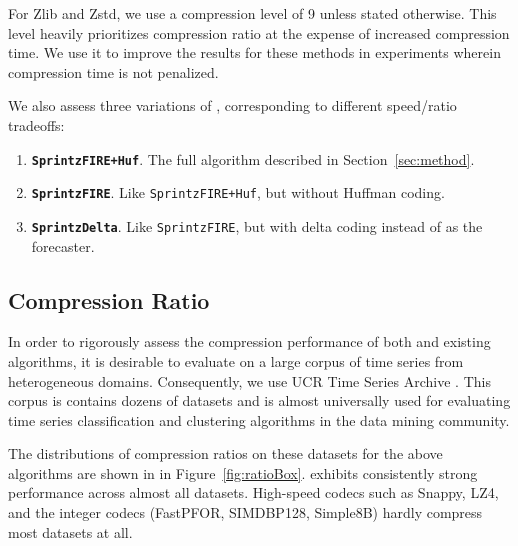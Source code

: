For Zlib and Zstd, we use a compression level of 9 unless stated otherwise. This level heavily prioritizes compression ratio at the expense of increased compression time. We use it to improve the results for these methods in experiments wherein compression time is not penalized.

We also assess three variations of \mine, corresponding to different speed/ratio tradeoffs:%
\begin{enumerate}[leftmargin=2mm]
\itemsep-1mm
    \item \textbf{\texttt{SprintzFIRE+Huf}}. The full algorithm described in Section~\ref{sec:method}.
    \item \textbf{\texttt{SprintzFIRE}}. Like \texttt{SprintzFIRE+Huf}, but without Huffman coding.
    \item \textbf{\texttt{SprintzDelta}}. Like \texttt{SprintzFIRE}, but with delta coding instead of \fire as the forecaster.
\end{enumerate}



\subsection{Compression Ratio}

In order to rigorously assess the compression performance of both \minesp and existing algorithms, it is desirable to evaluate on a large corpus of time series from heterogeneous domains. Consequently, we use UCR Time Series Archive \cite{ucrTimeSeries}. This corpus is contains dozens of datasets and is almost universally used for evaluating time series classification and clustering algorithms in the data mining community.

The distributions of compression ratios on these datasets for the above algorithms are shown in in Figure~\ref{fig:ratioBox}. \mine \text{} exhibits consistently strong performance across almost all datasets. High-speed codecs such as Snappy, LZ4, and the integer codecs (FastPFOR, SIMDBP128, Simple8B) hardly compress most datasets at all.

